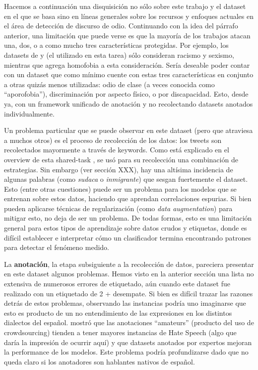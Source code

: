 Hacemos a continuación una disquisición no sólo sobre este trabajo y el dataset en el que se basa sino en líneas generales sobre los recursos y enfoques actuales en el área de detección de discurso de odio. Continuando con la idea del párrafo anterior, una limitación que puede verse es que la mayoría de los trabajos atacan una, dos, o a como mucho tres características protegidas. Por ejemplo, los datasets de \cite{waseem2016hateful} y \cite{hateval2019semeval} (el utilizado en esta tarea) sólo consideran racismo y sexismo, mientras que \citet{Davidson2017AutomatedHS} agrega homofobia a esta consideración. Sería deseable poder contar con un dataset que como mínimo cuente con estas tres características en conjunto a otras quizás menos utilizadas: odio de clase (a veces conocida como ``aporofobia''), discriminación por aspecto físico, o por discapacidad. Esto, desde ya, con un framework unificado de anotación y no recolectando datasets anotados individualmente.

Un problema particular que se puede observar en este dataset (pero que atraviesa a muchos otros) es el proceso de recolección de los datos: los tweets son recolectados mayormente a través de keywords. Como está explicado en el overview de esta shared-task \cite{hateval2019semeval}, se usó para su recolección una combinación de estrategias. Sin embargo (ver sección XXX), hay una altísima incidencia de algunas palabras (como \emph{sudaca} o \emph{inmigrante}) que sesgan fuertemente el dataset. Esto (entre otras cuestiones) puede ser un problema para los modelos que se entrenan sobre estos datos, haciendo que aprendan correlaciones espurias. Si bien pueden aplicarse técnicas de regularización (como \emph{data augmentation}) para mitigar
esto, no deja de ser un problema. De todas formas, esto es una limitación general para estos tipos de aprendizaje sobre datos crudos y etiquetas, donde es difícil establecer e interpretar cómo un clasificador termina encontrando patrones para detectar el fenómeno medido.

La \textbf{anotación}, la etapa subsiguiente a la recolección de datos, pareciera presentar en este dataset algunos problemas. Hemos visto en la anterior sección una lista no extensiva de numerosos errores de etiquetado, aún cuando este dataset fue realizado con un etiquetado de 2 + desempate. Si bien es difícil trazar las razones detrás de estos problemas, observando las instancias podría uno imaginarse que esto es producto de un no entendimiento de las expresiones en los distintos dialectos del español. \citet{waseem-2016-racist} mostró que las anotaciones ``amateurs'' (producto del uso de crowdsourcing) tienden a tener mayores instancias de Hate Speech (algo que daría la impresión de ocurrir aquí) y que datasets anotados por expertos mejoran la performance de los modelos. Este problema podría profundizarse dado que no queda claro si los anotadores son hablantes nativos de español.

